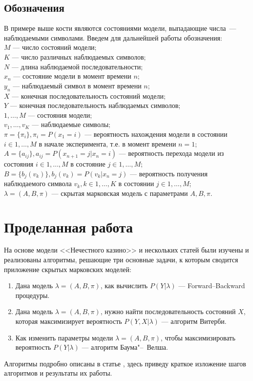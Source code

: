 \documentclass[]{article}
\begin{document}
	\subsection{Обозначения}	
		В примере выше кости являются состояниями модели, выпадающие числа~--- наблюдаемыми символами. Введем для дальнейшей работы обозначения:
		\vspace{0.5cm}\\	
		$M$ --- число состояний модели;\\
		$K$ --- число различных наблюдаемых символов;\\
		$N$ --- длина наблюдаемой последовательности;\\
		$x_{n}$ --- состояние модели в момент времени $n$;\\
		$y_{n}$ --- наблюдаемый символ в момент времени $n$;\\
		$X$ --- конечная последовательность состояний модели;\\
		$Y$ --- конечная последовательность наблюдаемых символов;\\
		$1,\dots, M$ --- состояния модели;\\
		$v_{1}, \dots, v_{K}$ --- наблюдаемые символы;\\
		$\pi = \{\pi_{i}\}, \pi_{i}=P(x_{1}=i)$ --- вероятность нахождения модели в состоянии $i \in 1, \dots, M$ в начале эксперимента, т.е. в момент времени $n=1$;\\
		$A = \{a_{ij}\}, a_{ij}=P(x_{n+1}=j|x_{n}=i)$ --- вероятность перехода модели из состояния $i \in 1, \dots, M$ в состояние $j \in 1, \dots, M$;\\
		$B = \{b_{j}(v_{k})\}, b_{j}(v_{k})=P(v_{k}|x_{n}=j)$ --- вероятность получения наблюдаемого символа $v_{k}, k \in 1,\dots, K$ в состоянии $j  \in 1, \dots, M$;\\		
		$\lambda = (A, B, \pi)$ --- скрытая марковская модель с параметрами $A, B, \pi$.\\	
		
	\section{Проделанная работа}
		На основе модели <<Нечестного казино>> и нескольких статей \cite{Dugad96,Stamp21,Jurafsky21,Rabiner89} были изучены и реализованы алгоритмы, решающие три основные задачи, к которым сводится приложение скрытых марковских моделей:
		\begin{enumerate}
			\item Дана модель $\lambda = (A, B, \pi)$, как вычислить $P(Y|\lambda)$ --- Forward--Backward процедуры.
			\item Дана модель $\lambda = (A, B, \pi)$, нужно найти последовательность состояний $X$, которая максимизирует вероятность $P(Y,X|\lambda)$ --- алгоритм Витерби.
			\item Как изменить параметры модели $\lambda = (A, B, \pi)$, чтобы максимизировать вероятность $P(Y|\lambda)$ --- алгоритм Баума"--~Велша.
		\end{enumerate}
		Алгоритмы подробно описаны в статье \cite{Dugad96}, здесь приведу краткое изложение шагов алгоритмов и результаты их работы.
		
\end{document}
